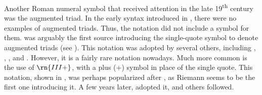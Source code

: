 
Another Roman numeral symbol that received attention in the
late 19\textsuperscript{th} century was the augmented triad.
In the early syntax introduced in
\textcite{weber1817versuch}, there were no examples of
augmented triads. Thus, the notation did not include a
symbol for them. \textcite{richter1860lehrbuch} was arguably
the first source introducing the single-quote symbol to
denote augmented triads (see
). This
notation was adopted by several others, including
\textcite{jadassohn1883lehrbuch},
\textcite{broekhoven1889system}, \textcite{buwa1893schule},
and \textcite{shepard1896harmony}. However, it is a fairly
rare notation nowadays. Much more common is the use of
$\rn{III+}$, with a plus ($+$) symbol in place of the single
quote. This notation, shown in
, was
perhaps popularized after \textcite{riemann1890katechismus},
as Riemann seems to be the first one introducing it. A few
years later, \textcite{chadwick1897harmony} adopted it, and
others followed. 


